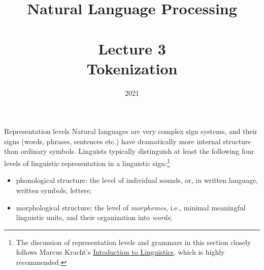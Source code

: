 \documentclass[style=upen, size=14pt]{powerdot}
\newcommand{\gold}{\color{arany}}
\begin{document}
\title{Natural Language Processing\\~~\\Lecture 3\\Tokenization}

\date{2021}
\maketitle


\begin{slide}{Representation levels}
  Natural languages are very complex sign systems, and their signs (words,
  phrases, sentences etc.) have dramatically more internal structure than
  ordinary symbols. Linguists typically distinguish at least the following four
  levels of linguistic representation in a linguistic sign:\footnote{The
    discussion of representation levels and grammars in this section closely
    follows Marcus Kracht's
    \href{https://linguistics.ucla.edu/people/Kracht/courses/ling20-fall07/ling-intro.pdf}{Intoduction to Linguistics}, which is highly recommended.}
  \begin{itemize}
  \item {\gold phonological structure}: the level of individual sounds, or, in
    written language, written symbols, letters;
  \item {\gold morphological structure}: the level of \emph{morphemes}, i.e.,
    minimal  meaningful linguistic units, and their organization into \emph{words};
  \end{itemize}
\end{slide}
\end{document}
